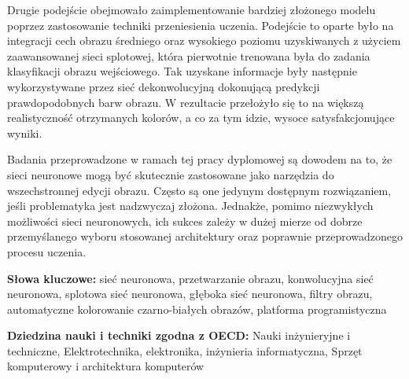   Drugie podejście obejmowało zaimplementowanie bardziej złożonego modelu
  poprzez zastosowanie techniki przeniesienia uczenia. Podejście to oparte
  było na integracji cech obrazu średniego oraz wysokiego poziomu
  uzyskiwanych z użyciem
  zaawansowanej sieci splotowej, która pierwotnie trenowana była do zadania
  klasyfikacji obrazu wejściowego.
  Tak uzyskane informacje były następnie wykorzystywane przez sieć
  dekonwolucyjną dokonującą predykcji prawdopodobnych barw obrazu.
  W rezultacie przełożyło się to na większą realistyczność otrzymanych kolorów,
  a co za tym idzie, wysoce satysfakcjonujące wyniki.

  Badania przeprowadzone w ramach tej pracy dyplomowej są dowodem na to, że
  sieci neuronowe mogą być skutecznie zastosowane jako narzędzia do wszechstronnej
  edycji obrazu. Często są one jedynym dostępnym rozwiązaniem, jeśli problematyka
  jest nadzwyczaj złożona. Jednakże, pomimo niezwykłych możliwości sieci
  neuronowych, ich sukces zależy w dużej mierze od dobrze przemyślanego
  wyboru stosowanej architektury oraz poprawnie przeprowadzonego
  procesu uczenia.

  \bigskip

  \noindent\textbf{Słowa kluczowe:} sieć neuronowa, przetwarzanie obrazu,
  konwolucyjna sieć neuronowa, splotowa sieć neuronowa,
  głęboka sieć neuronowa, filtry obrazu, automatyczne kolorowanie czarno-białych
  obrazów, platforma programistyczna

  \bigskip

  \noindent\textbf{Dziedzina nauki i techniki zgodna z OECD:} Nauki
  inżynieryjne i techniczne, Elektrotechnika, elektronika, inżynieria
  informatyczna, Sprzęt komputerowy i architektura komputerów
